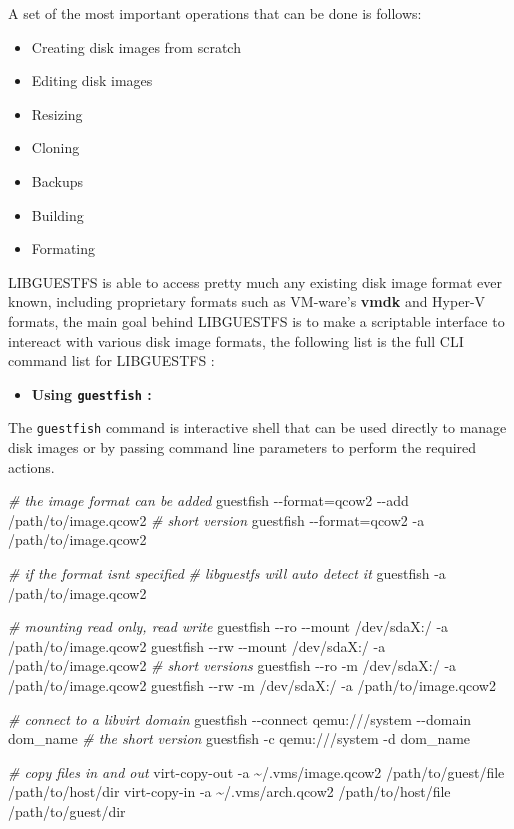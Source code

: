 \documentclass[
  14pt,
  english,
  a4paper,
]{scrreprt}
\newenvironment{Shaded}{}{}
\newcommand{\CommentTok}[1]{\textcolor[rgb]{0.38,0.63,0.69}{\textit{#1}}}
\newcommand{\ExtensionTok}[1]{#1}
\newcommand{\NormalTok}[1]{#1}
\providecommand{\tightlist}{%
  \setlength{\itemsep}{0pt}\setlength{\parskip}{0pt}}
\begin{document}
A set of the most important operations that can be done is follows:

\begin{itemize}
\tightlist
\item
  Creating disk images from scratch
\item
  Editing disk images
\item
  Resizing
\item
  Cloning
\item
  Backups
\item
  Building
\item
  Formating
\end{itemize}

LIBGUESTFS is able to access pretty much any existing disk image format
ever known, including proprietary formats such as VM-ware's
\textbf{vmdk} and Hyper-V formats, the main goal behind LIBGUESTFS is to
make a scriptable interface to intereact with various disk image
formats, the following list is the full CLI command list for LIBGUESTFS
:

\begin{itemize}
\tightlist
\item
  \textbf{Using \texttt{guestfish} :}
\end{itemize}

The \texttt{guestfish} command is interactive shell that can be used
directly to manage disk images or by passing command line parameters to
perform the required actions.

\begin{Shaded}
\begin{Highlighting}[]
\CommentTok{\# the image format can be added}
\ExtensionTok{guestfish}\NormalTok{ {-}{-}format=qcow2 {-}{-}add /path/to/image.qcow2}
\CommentTok{\# short version}
\ExtensionTok{guestfish}\NormalTok{ {-}{-}format=qcow2 {-}a /path/to/image.qcow2}

\CommentTok{\# if the format isn\textquotesingle{}t specified}
\CommentTok{\# libguestfs will auto detect it}
\ExtensionTok{guestfish}\NormalTok{ {-}a /path/to/image.qcow2}

\CommentTok{\# mounting read only, read write}
\ExtensionTok{guestfish}\NormalTok{ {-}{-}ro {-}{-}mount /dev/sdaX:/ {-}a /path/to/image.qcow2}
\ExtensionTok{guestfish}\NormalTok{ {-}{-}rw {-}{-}mount /dev/sdaX:/ {-}a /path/to/image.qcow2}
\CommentTok{\# short versions}
\ExtensionTok{guestfish}\NormalTok{ {-}{-}ro {-}m /dev/sdaX:/ {-}a /path/to/image.qcow2}
\ExtensionTok{guestfish}\NormalTok{ {-}{-}rw {-}m /dev/sdaX:/ {-}a /path/to/image.qcow2}

\CommentTok{\# connect to a libvirt domain}
\ExtensionTok{guestfish}\NormalTok{ {-}{-}connect qemu:///system {-}{-}domain dom\_name}
\CommentTok{\# the short version}
\ExtensionTok{guestfish}\NormalTok{ {-}c qemu:///system {-}d dom\_name}

\CommentTok{\# copy files in and out}
\ExtensionTok{virt{-}copy{-}out}\NormalTok{ {-}a \textasciitilde{}/.vms/image.qcow2 /path/to/guest/file /path/to/host/dir}
\ExtensionTok{virt{-}copy{-}in}\NormalTok{ {-}a \textasciitilde{}/.vms/arch.qcow2 /path/to/host/file /path/to/guest/dir}
\end{Highlighting}
\end{Shaded}
\end{document}
